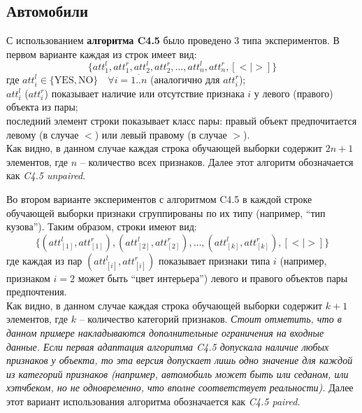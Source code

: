 	\subsection{Автомобили}
	\label{subsec:exp_cars}
		
		
		
		С использованием \textbf{алгоритма C4.5} было проведено 3 типа экспериментов. В первом варианте каждая из строк имеет вид: 
		\begin{equation}
		\label{eq:c4.5_unpaired_row}
		\{att_1^l, att_1^r, att_2^l, att_2^r, \dots, att_n^l, att_n^r, [< | >]\}
		\end{equation}
		где $att_i^l \in \{\text{YES}, \text{NO}\} \quad \forall i = \overline{1..n}$ (аналогично для $att_i^r$); \\
		$att_i^l$ ($att_i^r$) показывает наличие или отсутствие признака $i$ у левого (правого) объекта из пары; \\
		последний элемент строки показывает класс пары: правый объект предпочитается левому (в случае $<$) или левый правому (в случае $>$). \\
		Как видно, в данном случае каждая строка обучающей выборки содержит $2n + 1$ элементов, где $n$ – количество всех признаков. Далее этот алгоритм обозначается как \emph{C4.5 unpaired}.
		
		Во втором варианте экспериментов с алгоритмом C4.5 в каждой строке обучающей выборки признаки сгруппированы по их типу (например, ``тип кузова''). Таким образом, строки имеют вид:
		\begin{equation}
		\label{eq:c4.5_paired_row}
		\{(att_{[1]}^l, att_{[1]}^r), (att_{[2]}^l, att_{[2]}^r), \dots, (att_{[k]}^l, att_{[k]}^r), [< | >]\}
		\end{equation}
		где каждая из пар $(att_{[i]}^l, att_{[i]}^r)$ показывает признаки типа $i$ (например, признаком $i=2$ может быть ``цвет интерьера'') левого и правого объектов пары предпочтения. \\
		Как видно, в данном случае каждая строка обучающей выборки содержит $k + 1$ элементов, где $k$ – количество категорий признаков. \emph{Стоит отметить, что в данном примере накладываются дополнительные ограничения на входные данные. Если первая адаптация алгоритма C4.5 допускала наличие любых признаков у объекта, то эта версия допускает лишь одно значение для каждой из категорий признаков (например, автомобиль может быть или седаном, или хэтчбеком, но не одновременно, что вполне соответствует реальности).} Далее этот вариант использования алгоритма обозначается как \emph{C4.5 paired}.
		
